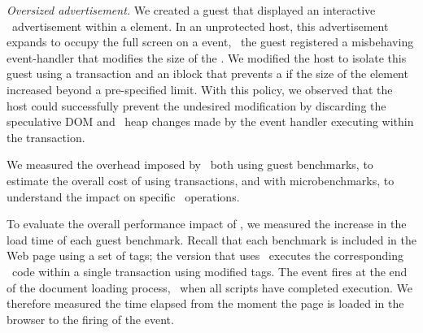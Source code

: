\begin{mylist}
\item \textit{Oversized advertisement.} We created a guest that displayed an
interactive \js\ advertisement within a  element. In an unprotected
host, this advertisement expands to occupy the full screen on a
 event, \ie~the guest registered a misbehaving event-handler
that modifies the size of the .  We modified the host to isolate this
guest using a transaction and an iblock that prevents a  if the
size of the  element increased beyond a pre-specified limit. With
this policy, we observed that the host could successfully prevent the undesired
 modification by discarding the speculative DOM and \js\ heap changes
made by the event handler executing within the transaction.

%
\end{mylist}


\label{section:evaluation:performance}
%
We measured the overhead imposed by \txjs\ both using guest benchmarks, to
estimate the overall cost of using transactions, and with
microbenchmarks, to understand the impact on specific \js\ operations. 

%
To evaluate the overall performance impact of \txjs, we measured the increase
in the load time of each guest benchmark.  Recall that each benchmark is
included in the Web page using a set of  tags; the version that
uses \txjs\ executes the corresponding \js\ code within a single transaction
using modified  tags.  The  event fires at the end of
the document loading process, \ie~when all scripts have completed execution. We
therefore measured the time elapsed from the moment the page is loaded in the
browser to the firing of the  event.

